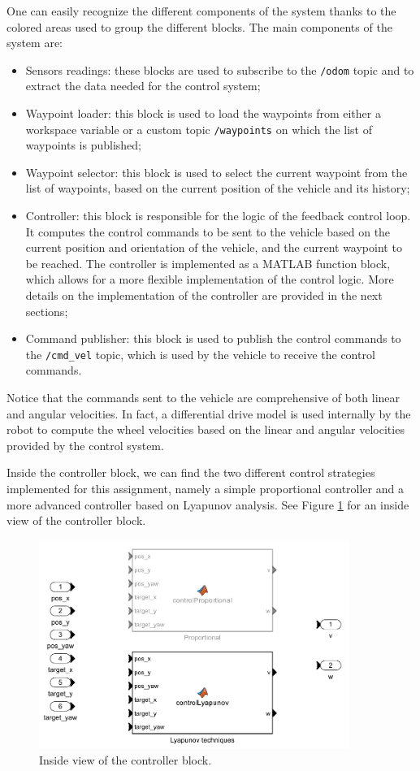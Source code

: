 One can easily recognize the different components of the system thanks to the colored areas used to group the different blocks.
The main components of the system are:

\begin{itemize}
    \item Sensors readings: these blocks are used to subscribe to the \texttt{/odom} topic and to extract the data needed for the control system;
    \item Waypoint loader: this block is used to load the waypoints from either a workspace variable or a custom topic \texttt{/waypoints} on which the list of waypoints is published;
    \item Waypoint selector: this block is used to select the current waypoint from the list of waypoints, based on the current position of the vehicle and its history;
    \item Controller: this block is responsible for the logic of the feedback control loop. It computes the control commands to be sent to the vehicle based on the current position and orientation of the vehicle, and the current waypoint to be reached. The controller is implemented as a MATLAB function block, which allows for a more flexible implementation of the control logic. More details on the implementation of the controller are provided in the next sections;
    \item Command publisher: this block is used to publish the control commands to the \texttt{/cmd\_vel} topic, which is used by the vehicle to receive the control commands.
\end{itemize}

Notice that the commands sent to the vehicle are comprehensive of both linear and angular velocities.
In fact, a differential drive model is used internally by the robot to compute the wheel velocities based on the linear and angular velocities provided by the control system.

Inside the controller block, we can find the two different control strategies implemented for this assignment, namely a simple proportional controller and a more advanced controller based on Lyapunov analysis.
See Figure \ref{fig:controller_block} for an inside view of the controller block.

\begin{figure}[H]
    \centering
    \includegraphics[width=0.9\textwidth]{./img/MATLAB/controller.pdf}
    \caption{Inside view of the controller block.}
    \label{fig:controller_block}
\end{figure}
